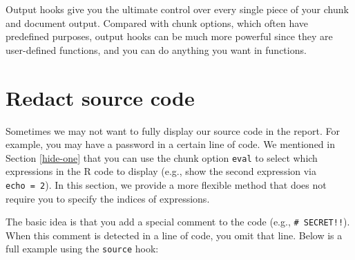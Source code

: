 \documentclass[
  11pt,
]{krantz}
\newenvironment{Shaded}{\begin{snugshade}}{\end{snugshade}}
\newcommand{\BaseNTok}[1]{\textcolor[rgb]{0.06,0.06,0.06}{#1}}
\newcommand{\NormalTok}[1]{#1}
\begin{document}
Output hooks give you the ultimate control over every single piece of your chunk and document output. Compared with chunk options, which often have predefined purposes, output hooks can be much more powerful since they are user-defined functions, and you can do anything you want in functions.

\hypertarget{hook-hide}{%
\section{Redact source code}\label{hook-hide}}

Sometimes we may not want to fully display our source code in the report. For example, you may have a password in a certain line of code. We mentioned in Section \ref{hide-one} that you can use the chunk option \texttt{eval} to select which expressions in the R code to display (e.g., show the second expression via \texttt{echo\ =\ 2}). In this section, we provide a more flexible method that does not require you to specify the indices of expressions.

The basic idea is that you add a special comment to the code (e.g., \texttt{\#\ SECRET!!}). When this comment is detected in a line of code, you omit that line. Below is a full example using the \texttt{source} hook:

\begin{Shaded}
\end{Shaded}
\end{document}
